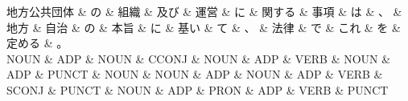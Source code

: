 \documentclass[tikz,border=5pt]{standalone}
\begin{document}
\normalsize
\begin{dependency}[edge unit distance=12.0pt]
    \begin{deptext}[column sep=1em]
        地方公共団体 \& の \& 組織 \& 及び \& 運営 \& に \& 関する \& 事項 \& は \& 、 \& 地方 \& 自治 \& の \& 本旨 \& に \& 基い \& て \& 、 \& 法律 \& で \& これ \& を \& 定める \& 。\\
        NOUN \& ADP \& NOUN \& CCONJ \& NOUN \& ADP \& VERB \& NOUN \& ADP \& PUNCT \& NOUN \& NOUN \& ADP \& NOUN \& ADP \& VERB \& SCONJ \& PUNCT \& NOUN \& ADP \& PRON \& ADP \& VERB \& PUNCT\\
    \end{deptext}
\end{dependency}
\end{document}
